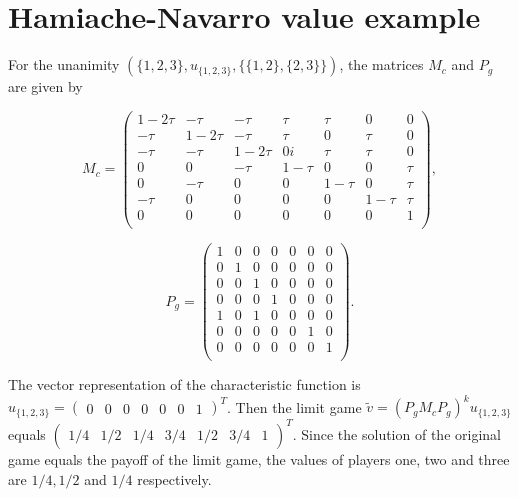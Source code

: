 \chapter{Hamiache-Navarro value example}
\label{app:HN_example}

For the unanimity $(\{1, 2, 3\}, u_{\{1, 2, 3\}}, \{\{1, 2\}, \{2, 3\}\})$, the matrices $M_c$ and $P_g$ are 
given by\cite{hamiache_associated_2020}


\begin{equation}
	M_c = \begin{pmatrix}
		1 - 2\tau & -\tau     & -\tau     & \tau     & \tau     & 0        & 0    \\
		-\tau     & 1 - 2\tau & -\tau     & \tau     & 0        & \tau     & 0    \\
		-\tau     & -\tau     & 1 - 2\tau & 0i       & \tau     & \tau     & 0    \\
		0         & 0         & -\tau     & 1 - \tau & 0        & 0        & \tau \\
		0         & -\tau     & 0         & 0        & 1 - \tau & 0        & \tau \\
		-\tau     & 0         & 0         & 0        & 0        & 1 - \tau & \tau \\
		0         & 0         & 0         & 0        & 0        & 0        & 1    \\
	\end{pmatrix},
\end{equation}


\begin{equation}
	\renewcommand{\arraystretch}{0.7}
	P_g = \begin{pmatrix}
		1 & 0 & 0 & 0 & 0 & 0 & 0 \\
		0 & 1 & 0 & 0 & 0 & 0 & 0 \\
		0 & 0 & 1 & 0 & 0 & 0 & 0 \\
		0 & 0 & 0 & 1 & 0 & 0 & 0 \\
		1 & 0 & 1 & 0 & 0 & 0 & 0 \\
		0 & 0 & 0 & 0 & 0 & 1 & 0 \\
		0 & 0 & 0 & 0 & 0 & 0 & 1 \\
	\end{pmatrix}.
\end{equation}


The vector representation of the characteristic function is $u_{\{1, 2, 3\}} = \left(\begin{smallmatrix} 0 & 0 & 0 & 0 & 0 & 0 & 1 \end{smallmatrix}\right)^T$.
Then the limit game $\tilde{v} = (P_g M_c P_g)^k u_{\{1, 2, 3\}}$ equals 
$\left(\begin{smallmatrix} 1/4 & 1/2 & 1/4 & 3/4 & 1/2 & 3/4 & 1\end{smallmatrix}\right)^T$. Since the solution  of the 
original game equals the payoff of the limit game, the values of players one, two and three are $1/4, 1/2$ and $1/4$ respectively.


